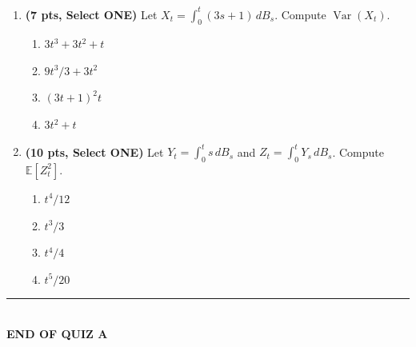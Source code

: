 \documentclass[11pt]{article}
\newcommand{\E}{\mathbb{E}}
\DeclareMathOperator{\Var}{Var}
\begin{document}
\begin{enumerate}
\item[\textbf{Q15.}] \textbf{(7 pts, Select ONE)} Let $X_t=\int_0^t(3s+1)\,dB_s$. Compute $\Var(X_t)$.
\begin{enumerate}
  \item $3t^3+3t^2+t$
  \item $9t^3/3 + 3t^2$
  \item $(3t+1)^2 t$
  \item $3t^2+t$
\end{enumerate}

\item[\textbf{Q16.}] \textbf{(10 pts, Select ONE)} Let $Y_t=\int_0^t s\,dB_s$ and $Z_t=\int_0^t Y_s\,dB_s$. Compute $\E[Z_t^2]$.
\begin{enumerate}
  \item $t^4/12$
  \item $t^3/3$
  \item $t^4/4$
  \item $t^5/20$
\end{enumerate}

\end{enumerate}

\vspace{10pt}
\begin{center}\rule{0.5\textwidth}{0.4pt}\\[2pt]\textbf{END OF QUIZ A}\end{center}
\end{document}
